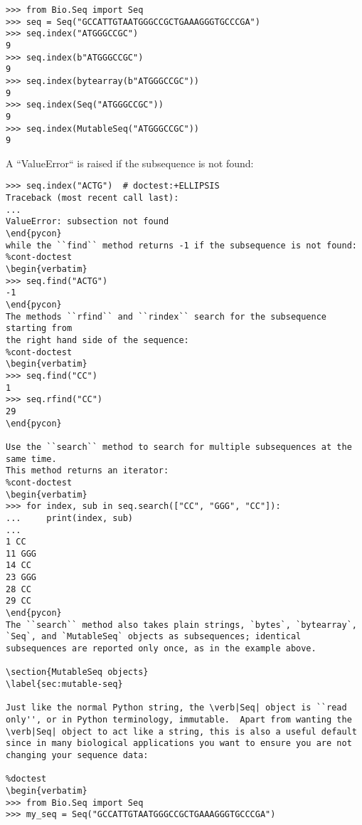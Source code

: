 \begin{verbatim}
>>> from Bio.Seq import Seq
>>> seq = Seq("GCCATTGTAATGGGCCGCTGAAAGGGTGCCCGA")
>>> seq.index("ATGGGCCGC")
9
>>> seq.index(b"ATGGGCCGC")
9
>>> seq.index(bytearray(b"ATGGGCCGC"))
9
>>> seq.index(Seq("ATGGGCCGC"))
9
>>> seq.index(MutableSeq("ATGGGCCGC"))
9
\end{verbatim}
A ``ValueError`` is raised if the subsequence is not found:
\begin{verbatim}
>>> seq.index("ACTG")  # doctest:+ELLIPSIS
Traceback (most recent call last):
...
ValueError: subsection not found
\end{pycon}
while the ``find`` method returns -1 if the subsequence is not found:
%cont-doctest
\begin{verbatim}
>>> seq.find("ACTG")
-1
\end{pycon}
The methods ``rfind`` and ``rindex`` search for the subsequence starting from
the right hand side of the sequence:
%cont-doctest
\begin{verbatim}
>>> seq.find("CC")
1
>>> seq.rfind("CC")
29
\end{pycon}

Use the ``search`` method to search for multiple subsequences at the same time.
This method returns an iterator:
%cont-doctest
\begin{verbatim}
>>> for index, sub in seq.search(["CC", "GGG", "CC"]):
...     print(index, sub)
...
1 CC
11 GGG
14 CC
23 GGG
28 CC
29 CC
\end{pycon}
The ``search`` method also takes plain strings, `bytes`, `bytearray`, `Seq`, and `MutableSeq` objects as subsequences; identical subsequences are reported only once, as in the example above.

\section{MutableSeq objects}
\label{sec:mutable-seq}

Just like the normal Python string, the \verb|Seq| object is ``read only'', or in Python terminology, immutable.  Apart from wanting the \verb|Seq| object to act like a string, this is also a useful default since in many biological applications you want to ensure you are not changing your sequence data:

%doctest
\begin{verbatim}
>>> from Bio.Seq import Seq
>>> my_seq = Seq("GCCATTGTAATGGGCCGCTGAAAGGGTGCCCGA")
\end{verbatim}

